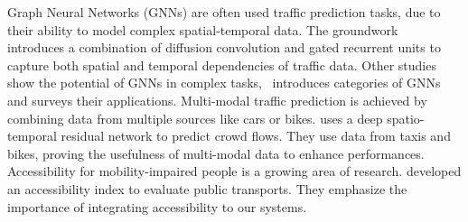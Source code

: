 Graph Neural Networks (GNNs) are often used traffic prediction tasks, due to their ability to model complex
spatial-temporal data.
The groundwork~\cite{DCRNN}
introduces a combination of diffusion convolution and gated recurrent units to capture both spatial and temporal
dependencies of traffic data.
Other studies show the potential of GNNs in complex tasks,~\cite{Wu2019A}
introduces categories of GNNs and surveys their applications.
Multi-modal traffic prediction is achieved by combining data from multiple sources like cars or bikes.
\cite{zhang2017deep} uses a deep spatio-temporal residual network to predict crowd flows.
They use data from taxis and bikes, proving the usefulness of multi-modal data to enhance performances.
Accessibility for mobility-impaired people is a growing area of research.
\cite{repetto2022developing} developed an accessibility index to evaluate public transports.
They emphasize the importance of integrating accessibility to our systems.
\vspace{1em}
